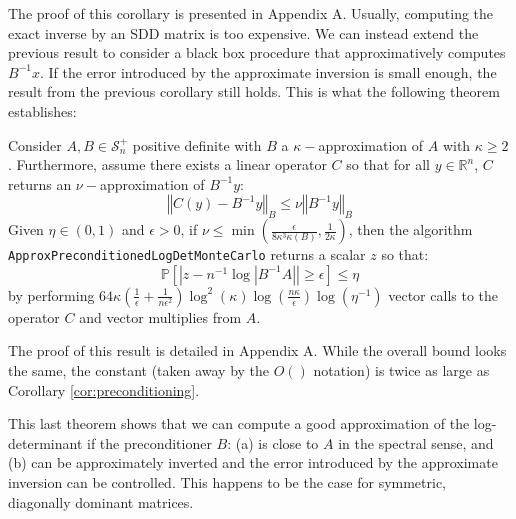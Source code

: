 The proof of this corollary is presented in Appendix A. Usually, computing
the exact inverse by an SDD matrix is too expensive. We can instead
extend the previous result to consider a black box procedure that
approximatively computes $B^{-1}x$. If the error introduced by the
approximate inversion is small enough, the result from the previous
corollary still holds. This is what the following theorem establishes:

\begin{theorem}\label{thm:preconditioning-approx}Consider $A,B\in\mathcal{S}_{n}^{+}$
positive definite with $B$ a $\kappa-$approximation of $A$ with
$\kappa\geq2$. Furthermore, assume there exists a linear operator
$C$ so that for all $y\in\mathbb{R}^{n}$, $C$ returns an $\nu-$approximation
of $B^{-1}y$:
\[
\left\Vert C\left(y\right)-B^{-1}y\right\Vert _{B}\leq\nu\left\Vert B^{-1}y\right\Vert _{B}
\]
Given $\eta\in\left(0,1\right)$ and $\epsilon>0$, if $\nu\leq\min\left(\frac{\epsilon}{8\kappa^{3}\kappa\left(B\right)},\frac{1}{2\kappa}\right)$,
then the algorithm \texttt{ApproxPreconditionedLogDetMonteCarlo} returns
a scalar $z$ so that:
\[
\mathbb{P}\left[\left|z-n^{-1}\log\left|B^{-1}A\right|\right|\geq\epsilon\right]\leq\eta
\]
by performing $64\kappa\left(\frac{1}{\epsilon}+\frac{1}{n\epsilon^{2}}\right)\log^{2}\left(\kappa\right)\log\left(\frac{n\kappa}{\epsilon}\right)\log\left(\eta^{-1}\right)$
vector calls to the operator $C$ and vector multiplies from $A$. 

\end{theorem}

The proof of this result is detailed in Appendix A. While the overall
bound looks the same, the constant (taken away by the $O\left(\right)$
notation) is twice as large as Corollary \ref{cor:preconditioning}.

This last theorem shows that we can compute a good approximation of
the log-determinant if the preconditioner $B$: (a) is close to $A$
in the spectral sense, and (b) can be approximately inverted and the
error introduced by the approximate inversion can be controlled. This
happens to be the case for symmetric, diagonally dominant matrices.
